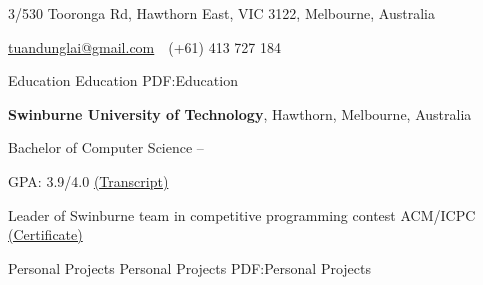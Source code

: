 \documentclass[letterpaper,MMMyyyy,nonstopmode]{simpleresumecv}
\newcommand{\CVAuthor}{Dung Lai}
\newcommand{\CVWebpage}{dunglai.github.io}
\begin{document}

\Title{\CVAuthor}

\begin{SubTitle}
{3/530 Tooronga Rd, Hawthorn East, VIC 3122, Melbourne, Australia}
\par
\href{mailto:tuandunglai@gmail.com}
{tuandunglai@gmail.com}
\,\SubBulletSymbol\,
(+61) 413 727 184
\,
\end{SubTitle}

\begin{Body}


\Section
{Education}
{Education}
{PDF:Education}

\Entry
{\textbf{Swinburne University of Technology}},
Hawthorn, Melbourne, Australia

\Gap
\BulletItem
Bachelor of Computer Science
\hfill
{} --

\SubBulletItem GPA: 3.9/4.0 
\href{https://dunglai.github.io/public/post-assets/About/AcademicTranscript.pdf}{(\color{blue}Transcript)}

\SubBulletItem Leader of Swinburne team in competitive programming contest ACM/ICPC \href{https://dunglai.github.io/public/post-assets/About/CVLatex/ACMcert.png}{(\color{blue}Certificate)}



\Section
{Personal Projects}
{Personal Projects}
{PDF:Personal Projects}


\end{Body}
\end{document}
